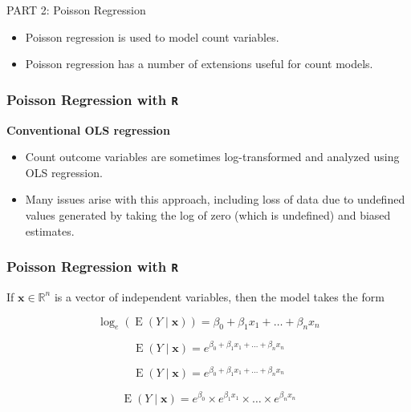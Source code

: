 \documentclass[MASTER.tex]{subfiles}
\begin{document}
%
 
\begin{frame}
	
	{\LARGE
	PART 2:	Poisson Regression
	} \bigskip
	\Large
	
	\medskip
	\begin{itemize}
		\item Poisson regression is used to model count variables.
		\item Poisson regression has a number of extensions useful for count models.

	\end{itemize}
\end{frame}
\begin{frame}[fragile]
	
	\frametitle{Poisson Regression with \texttt{R}}
	\Large
	\textbf{Conventional OLS regression}
	\begin{itemize}
		\item Count outcome variables are sometimes log-transformed and analyzed using OLS regression. 
		\item Many issues arise with this approach, including loss of data due to undefined values generated by taking the log of zero (which is undefined) and biased estimates.
	\end{itemize}
	\bigskip
\end{frame}

\begin{frame}
	\frametitle{Poisson Regression with \texttt{R}}
	\large
If $\mathbf{x} \in \mathbb{R}^n$ is a vector of independent variables, then the model takes the form
{
	\Large
\[\log_e (\operatorname{E}(Y\mid\mathbf{x}))= \beta_0 + \beta_1 x_1 + \ldots + \beta_n x_n  \]

\[\operatorname{E}(Y\mid\mathbf{x})= e^{\beta_0 + \beta_1 x_1 + \ldots + \beta_n x_n } \]

\[\operatorname{E}(Y\mid\mathbf{x})= e^{\beta_0 + \beta_1 x_1 + \ldots + \beta_n x_n } \]

\[\operatorname{E}(Y\mid\mathbf{x})= e^{\beta_0} \times e^{\beta_1 x_1} \times \ldots \times e^{\beta_n x_n} \]
}
\end{frame}
\end{document}
